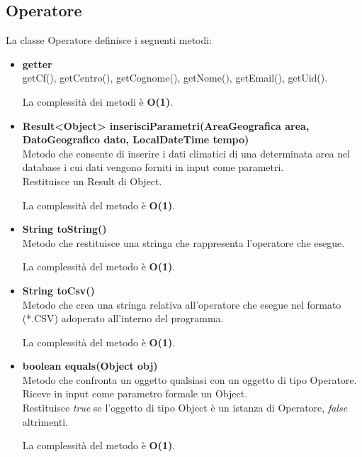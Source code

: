 \documentclass[a4paper, 12pt]{scrreprt}
\begin{document}
			\subsection{Operatore}
			La classe Operatore definisce i seguenti metodi:\\
			\begin{itemize}
				\item \textbf{getter}
				\\getCf(), getCentro(), getCognome(), getNome(), getEmail(), getUid().
				
				La complessit\`a dei metodi è \textbf{O(1)}.
				
				\item \textbf{Result<Object> inserisciParametri(AreaGeografica area, DatoGeografico dato, LocalDateTime tempo)}
				\\Metodo che consente di inserire i dati climatici di una determinata area nel database i cui dati vengono forniti in input come parametri.
				\\Restituisce un Result di Object.
				
				La complessit\`a del metodo è \textbf{O(1)}.
				
				\item \textbf{String toString()}
				\\Metodo che restituisce una stringa che rappresenta l'operatore che esegue.
				
				La complessit\`a del metodo è \textbf{O(1)}.
				
				\item \textbf{String toCsv()}
				\\Metodo che crea una stringa relativa all'operatore che esegue nel formato (*.CSV) adoperato all'interno del programma.
				
				La complessit\`a del metodo è \textbf{O(1)}.
				
				\item \textbf{boolean equals(Object obj)}
				\\Metodo che confronta un oggetto qualsiasi con un oggetto di tipo Operatore.
				\\Riceve in input come parametro formale un Object.
				\\Restituisce \textit{true} se l'oggetto di tipo Object \`e un istanza di Operatore, \textit{false} altrimenti.
				
				La complessit\`a del metodo è \textbf{O(1)}.
				
			\end{itemize}
\end{document}
